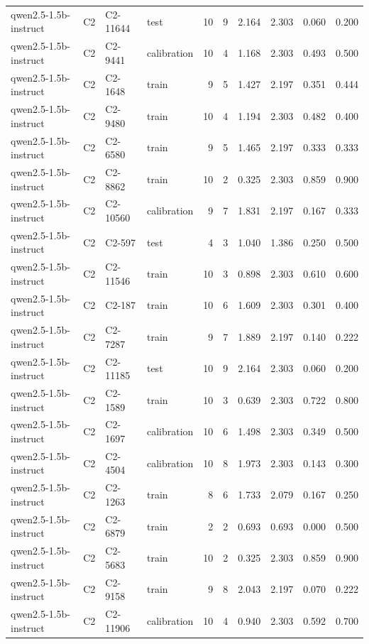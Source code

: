 \begin{table}
\begin{tabular}{llllrrrrrr}
qwen2.5-1.5b-instruct & C2 & C2-11644 & test & 10 & 9 & 2.164 & 2.303 & 0.060 & 0.200 \\
qwen2.5-1.5b-instruct & C2 & C2-9441 & calibration & 10 & 4 & 1.168 & 2.303 & 0.493 & 0.500 \\
qwen2.5-1.5b-instruct & C2 & C2-1648 & train & 9 & 5 & 1.427 & 2.197 & 0.351 & 0.444 \\
qwen2.5-1.5b-instruct & C2 & C2-9480 & train & 10 & 4 & 1.194 & 2.303 & 0.482 & 0.400 \\
qwen2.5-1.5b-instruct & C2 & C2-6580 & train & 9 & 5 & 1.465 & 2.197 & 0.333 & 0.333 \\
qwen2.5-1.5b-instruct & C2 & C2-8862 & train & 10 & 2 & 0.325 & 2.303 & 0.859 & 0.900 \\
qwen2.5-1.5b-instruct & C2 & C2-10560 & calibration & 9 & 7 & 1.831 & 2.197 & 0.167 & 0.333 \\
qwen2.5-1.5b-instruct & C2 & C2-597 & test & 4 & 3 & 1.040 & 1.386 & 0.250 & 0.500 \\
qwen2.5-1.5b-instruct & C2 & C2-11546 & train & 10 & 3 & 0.898 & 2.303 & 0.610 & 0.600 \\
qwen2.5-1.5b-instruct & C2 & C2-187 & train & 10 & 6 & 1.609 & 2.303 & 0.301 & 0.400 \\
qwen2.5-1.5b-instruct & C2 & C2-7287 & train & 9 & 7 & 1.889 & 2.197 & 0.140 & 0.222 \\
qwen2.5-1.5b-instruct & C2 & C2-11185 & test & 10 & 9 & 2.164 & 2.303 & 0.060 & 0.200 \\
qwen2.5-1.5b-instruct & C2 & C2-1589 & train & 10 & 3 & 0.639 & 2.303 & 0.722 & 0.800 \\
qwen2.5-1.5b-instruct & C2 & C2-1697 & calibration & 10 & 6 & 1.498 & 2.303 & 0.349 & 0.500 \\
qwen2.5-1.5b-instruct & C2 & C2-4504 & calibration & 10 & 8 & 1.973 & 2.303 & 0.143 & 0.300 \\
qwen2.5-1.5b-instruct & C2 & C2-1263 & train & 8 & 6 & 1.733 & 2.079 & 0.167 & 0.250 \\
qwen2.5-1.5b-instruct & C2 & C2-6879 & train & 2 & 2 & 0.693 & 0.693 & 0.000 & 0.500 \\
qwen2.5-1.5b-instruct & C2 & C2-5683 & train & 10 & 2 & 0.325 & 2.303 & 0.859 & 0.900 \\
qwen2.5-1.5b-instruct & C2 & C2-9158 & train & 9 & 8 & 2.043 & 2.197 & 0.070 & 0.222 \\
qwen2.5-1.5b-instruct & C2 & C2-11906 & calibration & 10 & 4 & 0.940 & 2.303 & 0.592 & 0.700 \\

\end{tabular}
\end{table}
